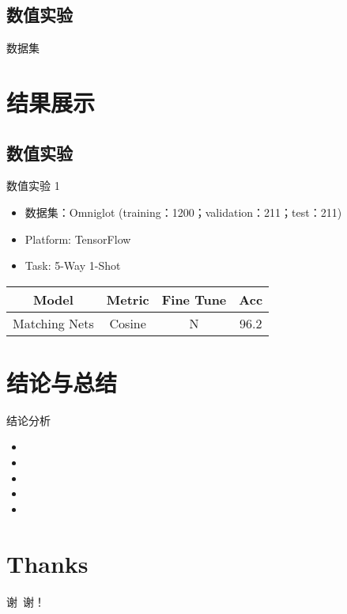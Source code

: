 \documentclass[10pt]{beamer}
\begin{document}
\subsection{数值实验}


\begin{frame}{数据集}


\end{frame}


\section{结果展示}
\subsection{数值实验}


\begin{frame}{数值实验 1}
\begin{itemize}
	\item 数据集：Omniglot (training：1200；validation：211；test：211)
	\item Platform: TensorFlow
	\item Task: 5-Way 1-Shot
\end{itemize}

	\begin{table}
	\centering
	\begin{tabular}{cccc}
	\hline
		Model & Metric & Fine Tune & Acc \\
	\hline
		Matching Nets & Cosine & N & 96.2 \\
	\hline
	\end{tabular}
\end{table}
	
\end{frame}


\section{结论与总结}


\begin{frame}{结论分析}
\begin{itemize}
	\item
	\item 
	\item 
	\item 
	\item 
	\end{itemize}
\end{frame}



\section*{Thanks}


\begin{frame}
  \begin{block}{}
  \centering
  \Huge \textcolor[rgb]{0.5,0.5,0.2}{谢\  谢！}
  \end{block}
\end{frame}
\end{document}
